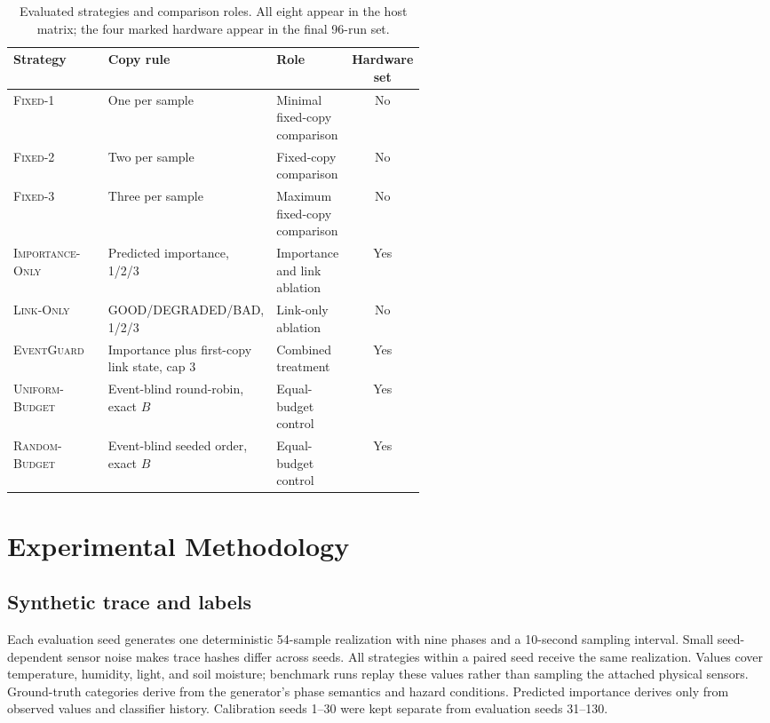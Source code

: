 \documentclass[11pt]{article}
\newcommand{\EG}{\textsc{EventGuard}}
\newcommand{\IO}{\textsc{Importance-Only}}
\newcommand{\LO}{\textsc{Link-Only}}
\newcommand{\UB}{\textsc{Uniform-Budget}}
\newcommand{\RB}{\textsc{Random-Budget}}
\newcommand{\Fone}{\textsc{Fixed-1}}
\newcommand{\Ftwo}{\textsc{Fixed-2}}
\newcommand{\Fthree}{\textsc{Fixed-3}}
\begin{document}
\begin{table}[t]
\centering
\footnotesize
\caption{Evaluated strategies and comparison roles. All eight appear in the host matrix; the four marked hardware appear in the final 96-run set.}
\label{tab:strategies}
\begin{tabularx}{\linewidth}{@{}p{0.23\linewidth}>{\raggedright\arraybackslash}p{0.31\linewidth}>{\raggedright\arraybackslash}Xc@{}}
\toprule
Strategy & Copy rule & Role & Hardware set \\
\midrule
\Fone{} & One per sample & Minimal fixed-copy comparison & No \\
\Ftwo{} & Two per sample & Fixed-copy comparison & No \\
\Fthree{} & Three per sample & Maximum fixed-copy comparison & No \\
\IO{} & Predicted importance, 1/2/3 & Importance and link ablation & Yes \\
\LO{} & GOOD/\allowbreak DEGRADED/\allowbreak BAD, 1/2/3 & Link-only ablation & No \\
\EG{} & Importance plus first-copy link state, cap 3 & Combined treatment & Yes \\
\UB{} & Event-blind round-robin, exact \(B\) & Equal-budget control & Yes \\
\RB{} & Event-blind seeded order, exact \(B\) & Equal-budget control & Yes \\
\bottomrule
\end{tabularx}
\end{table}

\section{Experimental Methodology}\label{sec:methodology}

\subsection{Synthetic trace and labels}\label{sec:synthetic-trace-and-labels}

Each evaluation seed generates one deterministic 54-sample realization with nine phases and a 10-second sampling interval. Small seed-dependent sensor noise makes trace hashes differ across seeds. All strategies within a paired seed receive the same realization. Values cover temperature, humidity, light, and soil moisture; benchmark runs replay these values rather than sampling the attached physical sensors. Ground-truth categories derive from the generator's phase semantics and hazard conditions. Predicted importance derives only from observed values and classifier history. Calibration seeds 1--30 were kept separate from evaluation seeds 31--130.
\end{document}
